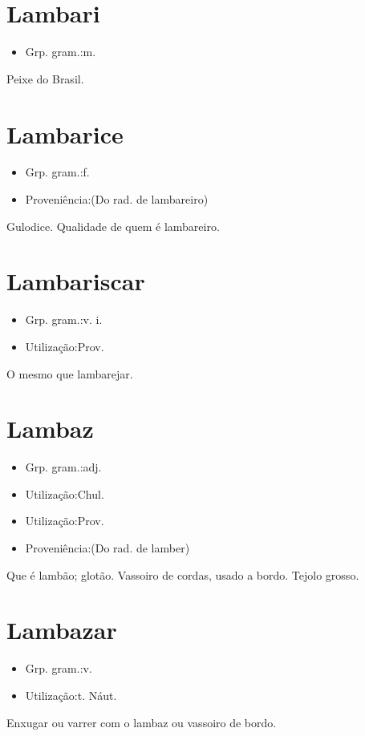 \section{Lambari}
\begin{itemize}
\item {Grp. gram.:m.}
\end{itemize}
Peixe do Brasil.
\section{Lambarice}
\begin{itemize}
\item {Grp. gram.:f.}
\end{itemize}
\begin{itemize}
\item {Proveniência:(Do rad. de \textunderscore lambareiro\textunderscore )}
\end{itemize}
Gulodice.
Qualidade de quem é lambareiro.
\section{Lambariscar}
\begin{itemize}
\item {Grp. gram.:v. i.}
\end{itemize}
\begin{itemize}
\item {Utilização:Prov.}
\end{itemize}
O mesmo que \textunderscore lambarejar\textunderscore .
\section{Lambaz}
\begin{itemize}
\item {Grp. gram.:adj.}
\end{itemize}
\begin{itemize}
\item {Utilização:Chul.}
\end{itemize}
\begin{itemize}
\item {Utilização:Prov.}
\end{itemize}
\begin{itemize}
\item {Proveniência:(Do rad. de \textunderscore lamber\textunderscore )}
\end{itemize}
Que é lambão; glotão.
Vassoiro de cordas, usado a bordo.
Tejolo grosso.
\section{Lambazar}
\begin{itemize}
\item {Grp. gram.:v.}
\end{itemize}
\begin{itemize}
\item {Utilização:t. Náut.}
\end{itemize}
Enxugar ou varrer com o lambaz ou vassoiro de bordo.
